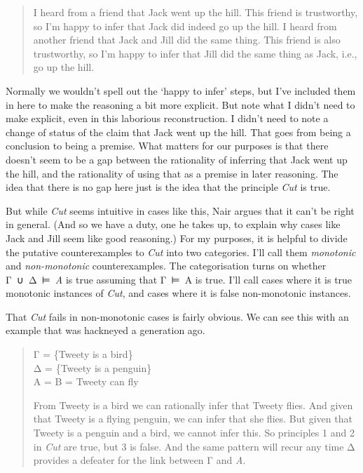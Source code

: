 \documentclass[
  12pt,
  letterpaper,
]{scrbook}
\begin{document}
\begin{quote}
I heard from a friend that Jack went up the hill. This friend is
trustworthy, so I'm happy to infer that Jack did indeed go up the hill.
I heard from another friend that Jack and Jill did the same thing. This
friend is also trustworthy, so I'm happy to infer that Jill did the same
thing as Jack, i.e., go up the hill.
\end{quote}

Normally we wouldn't spell out the `happy to infer' steps, but I've
included them in here to make the reasoning a bit more explicit. But
note what I didn't need to make explicit, even in this laborious
reconstruction. I didn't need to note a change of status of the claim
that Jack went up the hill. That goes from being a conclusion to being a
premise. What matters for our purposes is that there doesn't seem to be
a gap between the rationality of inferring that Jack went up the hill,
and the rationality of using that as a premise in later reasoning. The
idea that there is no gap here just is the idea that the principle
\emph{Cut} is true.

But while \emph{Cut} seems intuitive in cases like this, Nair argues
that it can't be right in general. (And so we have a duty, one he takes
up, to explain why cases like Jack and Jill seem like good reasoning.)
For my purposes, it is helpful to divide the putative counterexamples to
\emph{Cut} into two categories. I'll call them \emph{monotonic} and
\emph{non-monotonic} counterexamples. The categorisation turns on
whether Γ~∪~Δ~⊨~\emph{A} is true assuming that Γ~⊨~A is true. I'll call
cases where it is true monotonic instances of \emph{Cut}, and cases
where it is false non-monotonic instances.

That \emph{Cut} fails in non-monotonic cases is fairly obvious. We can
see this with an example that was hackneyed a generation ago.

\begin{quote}
Γ = \{Tweety is a bird\}\\
Δ = \{Tweety is a penguin\}\\
A = B = Tweety can fly

From Tweety is a bird we can rationally infer that Tweety flies. And
given that Tweety is a flying penguin, we can infer that she flies. But
given that Tweety is a penguin and a bird, we cannot infer this. So
principles 1 and 2 in \emph{Cut} are true, but 3 is false. And the same
pattern will recur any time Δ provides a defeater for the link between Γ
and \emph{A}.
\end{quote}
\end{document}
